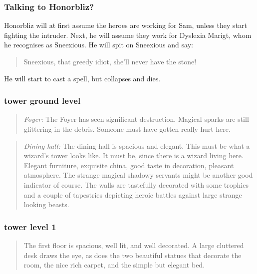\documentclass[11pt, twoside, titlepage, a4paper]{report}
\newenvironment{readoutloud}%
{\begin{quote}\begin{itshape}}%
{\end{itshape}\end{quote}}%
\begin{document}
\subsubsection*{Talking to Honorbliz?}
Honorbliz will at first assume the heroes are working for Sam, unless they start fighting the intruder. Next, he will assume they work for Dyslexia Marigt, whom he recognises as Sneexious. He will spit on Sneexious and say:
\begin{readoutloud}
Sneexious, that greedy idiot, she'll never have the stone!
\end{readoutloud}
He will start to cast a spell, but collapses and dies.


\subsubsection*{tower ground level}
\begin{readoutloud}
\emph{Foyer:}
The Foyer has seen significant destruction. Magical sparks are still glittering in the debris. Someone must have gotten really hurt here.
\end{readoutloud}

\begin{readoutloud}
\emph{Dining hall:}
The dining hall is spacious and elegant. This must be what a wizard's tower looks like. It must be, since there is a wizard living here. Elegant furniture, exquisite china, good taste in decoration, pleasant atmosphere. The strange magical shadowy servants might be another good indicator of course.
The walls are tastefully decorated with some trophies and a couple of tapestries depicting heroic battles against large strange looking beasts.
\end{readoutloud}


\subsubsection*{tower level 1}
\begin{readoutloud}
The first floor is spacious, well lit, and well decorated. A large cluttered desk draws the eye, as does the two beautiful statues that decorate the room, the nice rich carpet, and the simple but elegant bed.
\end{readoutloud}
\end{document}
